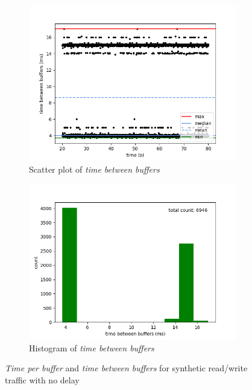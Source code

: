 \begin{figure}[H]
    \begin{subfigure}[t]{0.5\textwidth}
        \centering
        \includegraphics[scale=0.45]{img/synthetic_read_writes_no_wait_between_buffers_scatter.png}
        \caption{Scatter plot of \textit{time between buffers}}
    \end{subfigure}%
    \begin{subfigure}[t]{0.5\textwidth}
        \centering
        \includegraphics[scale=0.45]{img/synthetic_read_writes_no_wait_between_buffers_hist.png}
        \caption{Histogram of \textit{time between buffers}}
    \end{subfigure}

    \caption{\textit{Time per buffer} and \textit{time between buffers} for synthetic read/write traffic with no delay}
    \label{evaluation/results/synthetic-read-write-instructions-no-delay/plots}
\end{figure}

